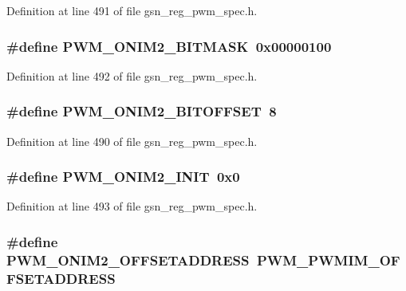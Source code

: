 Definition at line 491 of file gsn\_\-reg\_\-pwm\_\-spec.h.

\hypertarget{a00565_a45b02b49077c722e98c59b5fe89dd2a2}{
\subsubsection[{PWM\_\-ONIM2\_\-BITMASK}]{\setlength{\rightskip}{0pt plus 5cm}\#define PWM\_\-ONIM2\_\-BITMASK~0x00000100}}
\label{a00565_a45b02b49077c722e98c59b5fe89dd2a2}


Definition at line 492 of file gsn\_\-reg\_\-pwm\_\-spec.h.

\hypertarget{a00565_ac852c55151e65e0336a9303acd2be579}{
\subsubsection[{PWM\_\-ONIM2\_\-BITOFFSET}]{\setlength{\rightskip}{0pt plus 5cm}\#define PWM\_\-ONIM2\_\-BITOFFSET~8}}
\label{a00565_ac852c55151e65e0336a9303acd2be579}


Definition at line 490 of file gsn\_\-reg\_\-pwm\_\-spec.h.

\hypertarget{a00565_a30aff2b2296aa6b8ef04e418f92085e8}{
\subsubsection[{PWM\_\-ONIM2\_\-INIT}]{\setlength{\rightskip}{0pt plus 5cm}\#define PWM\_\-ONIM2\_\-INIT~0x0}}
\label{a00565_a30aff2b2296aa6b8ef04e418f92085e8}


Definition at line 493 of file gsn\_\-reg\_\-pwm\_\-spec.h.

\hypertarget{a00565_a798ecf352fa4c346ce9b536964ec0ce2}{
\subsubsection[{PWM\_\-ONIM2\_\-OFFSETADDRESS}]{\setlength{\rightskip}{0pt plus 5cm}\#define PWM\_\-ONIM2\_\-OFFSETADDRESS~PWM\_\-PWMIM\_\-OFFSETADDRESS}}
\label{a00565_a798ecf352fa4c346ce9b536964ec0ce2}



